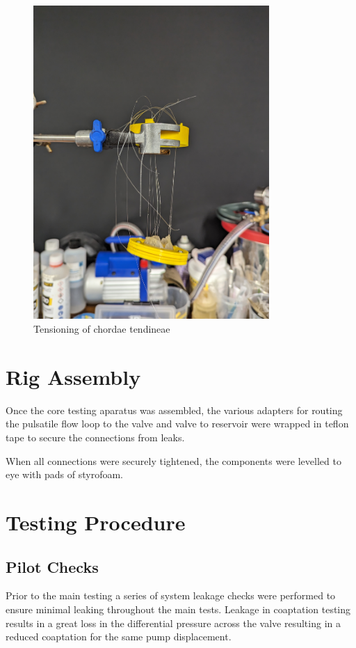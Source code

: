 \begin{figure}
    \centering
    \includegraphics[width=0.8\textwidth]{figures/assemblingfixtures.jpg}
    \caption{Tensioning of chordae tendineae}
    \label{fig:chordtens}
\end{figure}
\section{Rig Assembly}

Once the core testing aparatus was assembled, the various adapters for routing the pulsatile flow loop to the valve and valve to reservoir were wrapped in teflon tape to secure the connections from leaks.

When all connections were securely tightened, the components were levelled to eye with pads of styrofoam.

\section{Testing Procedure}

\subsection{Pilot Checks}
Prior to the main testing a series of system leakage checks were performed to ensure minimal leaking throughout the main tests. Leakage in coaptation testing results in a great loss in the differential pressure across the valve resulting in a reduced coaptation for the same pump displacement.

